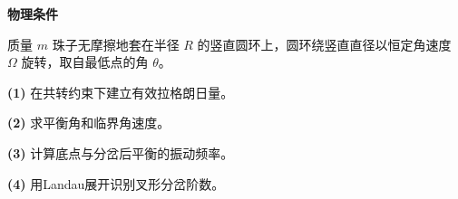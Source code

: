 \textbf{物理条件}\par 质量 \(m\) 珠子无摩擦地套在半径 \(R\) 的竖直圆环上，圆环绕竖直直径以恒定角速度 \(\Omega\) 旋转，取自最低点的角 \(\theta\)。
\par\noindent\textbf{(1)} 在共转约束下建立有效拉格朗日量。
\par\noindent\textbf{(2)} 求平衡角和临界角速度。
\par\noindent\textbf{(3)} 计算底点与分岔后平衡的振动频率。
\par\noindent\textbf{(4)} 用Landau展开识别叉形分岔阶数。

